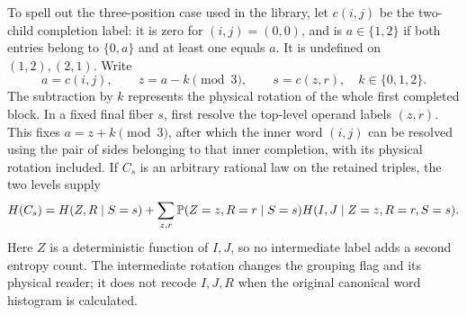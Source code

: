 To spell out the three-position case used in the library, let \(c(i,j)\)
be the two-child completion label: it is zero for \((i,j)=(0,0)\), and
is \(a\in\{1,2\}\) if both entries belong to \(\{0,a\}\) and at
least one equals \(a\).  It is undefined on \((1,2),(2,1)\).  Write
\[
 a=c(i,j),\qquad z=a-k\pmod3,\qquad s=c(z,r),
 \quad k\in\{0,1,2\}.
\]
The subtraction by \(k\) represents the physical rotation of the whole
first completed block.  In a fixed final fiber \(s\), first resolve the
top-level operand labels \((z,r)\).  This fixes \(a=z+k\pmod3\),
after which the inner word \((i,j)\) can be resolved using the pair of
sides belonging to that inner completion, with its physical rotation
included.  If \(C_s\) is an arbitrary rational law on the retained
triples, the two levels supply
\begin{equation}
 H(C_s)=H(Z,R\mid S=s)
       +\sum_{z,r}\mathbb P(Z=z,R=r\mid S=s)
                      H(I,J\mid Z=z,R=r,S=s).
 \label{alg:nested-completion-entropy}
\end{equation}
Here \(Z\) is a deterministic function of \(I,J\), so no intermediate
label adds a second entropy count.  The intermediate rotation changes
the grouping flag and its physical reader; it does not recode \(I,J,R\)
when the original canonical word histogram is calculated.

